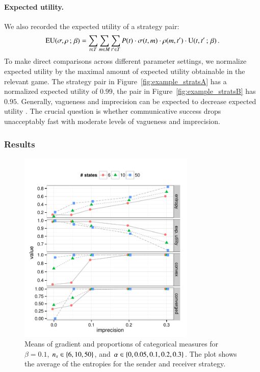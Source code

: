 \documentclass[fleqn,reqno,10pt]{article}
\newcommand{\imprecision}{\ensuremath{\alpha}} %
\newcommand{\toler}{\ensuremath{\beta}} %
\newcommand{\ns}{\ensuremath{n_s}} %
\renewcommand{\Pr}{\ensuremath{P}}
\begin{document}
\paragraph{Expected utility.} We also recorded the expected utility of
a strategy pair:
\begin{align*}
  \EU(\Sstrat,\Rstrat \myts ; \myts \toler) = \sum_{\state \in
    \States} \sum_{\messg \in \Messgs} \sum_{\state' \in \States}
  \Pr(\state) \cdot \Sstrat(\state, \messg) \cdot \Rstrat(\messg,
  \state') \cdot \Util(\state,\state' \myts ; \myts \toler)\,.
\end{align*}
To make direct comparisons across different parameter settings, we
normalize expected utility by the maximal amount of expected utility
obtainable in the relevant game. The strategy pair in
Figure~\ref{fig:example_stratsA} has a normalized expected utility of
$0.99$, the pair in Figure~\ref{fig:example_stratsB} has
$0.95$. Generally, vagueness and imprecision can be expected to
decrease expected utility
\citep[c.f.][]{Lipman2009:Why-is-Language}. The crucial question is
whether communicative success drops unacceptably fast with moderate
levels of vagueness and imprecision.

\subsubsection{Results}

\begin{figure}[t]
  \centering
  
  \includegraphics[width=0.75\textwidth]{plots/MeanMetrics3.pdf}

  \caption{Means of gradient and proportions of categorical measures
    for $\toler = 0.1$, $\ns \in \set{6, 10, 50}$, and $\imprecision
    \in \set{0, 0.05, 0.1, 0.2, 0.3}$. The plot shows the average of
    the entropies for the sender and receiver strategy.}
  \label{fig:MeanMetrics}
\end{figure}
\end{document}
